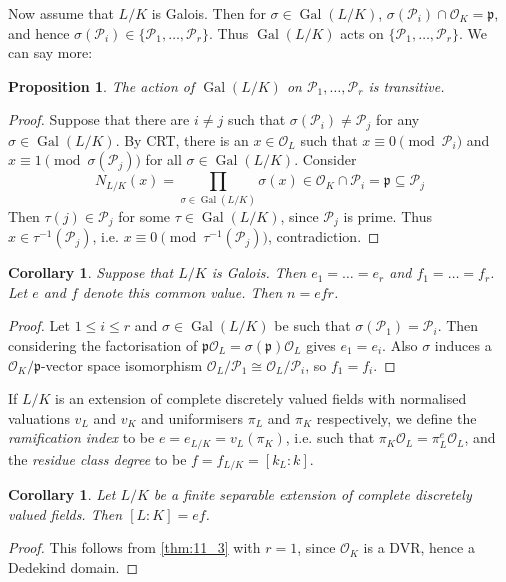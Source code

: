 \documentclass[11pt]{article}
\theoremstyle{definition}
\theoremstyle{plain}
\newtheorem{proposition}[definition]{Proposition}
\newtheorem{corollary}[definition]{Corollary}
\theoremstyle{remark}
\DeclareMathOperator{\Gal}{Gal}
\newcommand{\cO}{\mathcal{O}}
\newcommand{\cP}{\mathcal{P}}
\newcommand{\fp}{\mathfrak{p}}
\begin{document}
Now assume that $L / K$ is Galois. Then for $\sigma \in \Gal(L / K)$, $\sigma(\cP_i) \cap \cO_K = \fp$, and hence $\sigma(\cP_i) \in \{\cP_1, \ldots, \cP_r\}$. Thus $\Gal(L / K)$ acts on $\{\cP_1, \ldots, \cP_r\}$. We can say more:

\begin{proposition}\label{prop:11_4}
    The action of $\Gal(L / K)$ on $\cP_1, \ldots, \cP_r$ is transitive.
\end{proposition}
\begin{proof}
    Suppose that there are $i \neq j$ such that $\sigma(\cP_i) \neq \cP_j$ for any $\sigma \in \Gal(L / K)$. By CRT, there is an $x \in \cO_L$ such that $x \equiv 0 \pmod{\cP_i}$ and $x \equiv 1 \pmod{\sigma(\cP_j)}$ for all $\sigma \in \Gal(L/K)$. Consider
    \begin{equation*}
        N_{L/K}(x) = \prod_{\sigma \in \Gal(L/K)} \sigma(x) \in \cO_K \cap \cP_i = \fp \subseteq \cP_j
    \end{equation*}
    Then $\tau(j) \in \cP_j$ for some $\tau \in \Gal(L/K)$, since $\cP_j$ is prime. Thus $x \in \tau^{-1}(\cP_j)$, i.e. $x \equiv 0 \pmod{\tau^{-1}(\cP_j)}$, contradiction.
\end{proof}

\begin{corollary}\label{cor:11_5}
    Suppose that $L/K$ is Galois. Then $e_1 = \ldots = e_r$ and $f_1 = \ldots = f_r$. Let $e$ and $f$ denote this common value. Then $n = e f r$.
\end{corollary}
\begin{proof}
    Let $1 \le i \le r$ and $\sigma \in \Gal(L/K)$ be such that $\sigma(\cP_1) = \cP_i$. Then considering the factorisation of $\fp \cO_L = \sigma(\fp) \cO_L$ gives $e_1 = e_i$. Also $\sigma$ induces a $\cO_K / \fp$-vector space isomorphism $\cO_L / \cP_1 \cong \cO_L / \cP_i$, so $f_1 = f_i$.
\end{proof}

If $L / K$ is an extension of complete discretely valued fields with normalised valuations $v_L$ and $v_K$ and uniformisers $\pi_L$ and $\pi_K$ respectively, we define the \emph{ramification index} to be $e = e_{L/K} = v_L(\pi_K)$, i.e. such that $\pi_K \cO_L = \pi_L^e \cO_L$, and the \emph{residue class degree} to be $f = f_{L/K} = [k_L : k]$.

\begin{corollary}\label{cor:11_6}
    Let $L/K$ be a finite separable extension of complete discretely valued fields. Then $[L : K] = e f$.
\end{corollary}
\begin{proof}
    This follows from \autoref{thm:11_3} with $r = 1$, since $\cO_K$ is a DVR, hence a Dedekind domain.
\end{proof}
\end{document}

